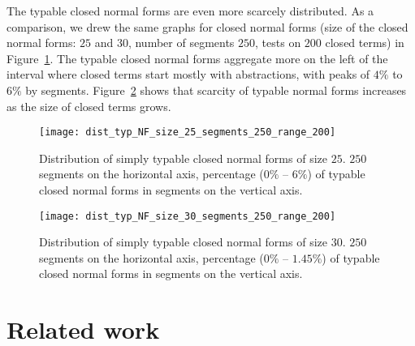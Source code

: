 \documentclass{jfp1}
\begin{document}
The typable closed normal forms are even more scarcely distributed. As a comparison,
we drew the same graphs for closed normal forms (size of the closed normal forms:
$25$ and $30$, number of segments $250$, tests on $200$ closed terms) in
Figure~\ref{fig:dist_typed_NF_size_25}.  The typable closed normal forms aggregate
more on the left of the interval where closed terms start mostly with abstractions,
with peaks of $4\%$ to $6\%$ by segments.  Figure~\ref{fig:dist_typed_NF_size_30}
shows that scarcity of typable normal forms increases as the size of closed terms grows.

\begin{figure}[htb!]
  \centering
   \texttt{[image: dist\_typ\_NF\_size\_25\_segments\_250\_range\_200]}
  \ifJFP
\else
\\\centerline{}
\fi
  \caption{Distribution of simply typable closed normal forms  of size \textbf{$25$}. $250$ segments on the
    horizontal axis, percentage ($0\%$ -- $6\%$) of typable closed normal forms in segments on the vertical axis.}
  \label{fig:dist_typed_NF_size_25}
\end{figure}

\begin{figure}[htb!]
  \centering
   \texttt{[image: dist\_typ\_NF\_size\_30\_segments\_250\_range\_200]}
  \ifJFP
\else
\\\centerline{}
\fi
  \caption{Distribution of simply typable closed normal forms  of size \textbf{$30$}. $250$ segments on the
    horizontal axis, percentage ($0\%$ -- $1.45\%$) of typable closed normal forms in segments on the vertical axis.}
  \label{fig:dist_typed_NF_size_30}
\end{figure}



\section{Related work}
\label{sec:related-work}
\end{document}
